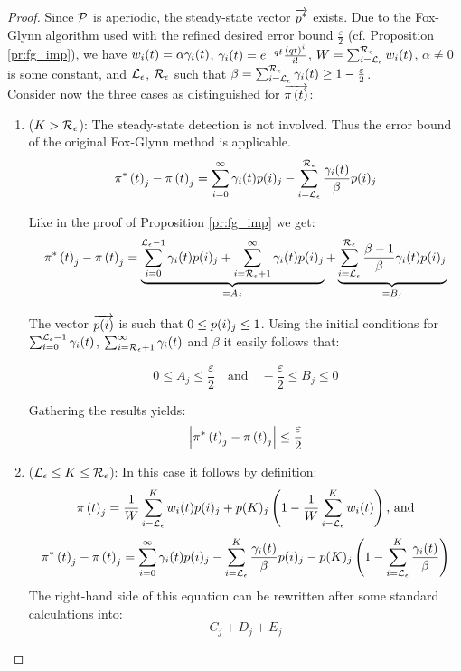 \documentclass{entcs}
\begin{document}
		{\small
			\begin{proof}
				Since $\mathcal{P}$ is aperiodic, the steady-state vector $\overrightarrow{p^{*}}$ exists. 
				Due to the Fox-Glynn algorithm used with the refined desired error bound $\frac{\varepsilon}{2}$ (cf. Proposition \ref{pr:fg_imp}), we have $w_{i}(t) = \alpha \gamma_{i}(t)$, $\gamma_{i}(t) = e^{-q t}\frac{\left( q t \right)^{i}}{i!} $, $W = \sum_{i = \mathcal{L}_{\epsilon}}^{\mathcal{R}_{\epsilon}} w_{i}(t)$, $\alpha \neq 0$ is some constant, and $\mathcal{L}_{\epsilon}$, $\mathcal{R}_{\epsilon}$ such that $\beta = \sum_{i=\mathcal{L}_{\epsilon}}^{\mathcal{R}_{\epsilon}} \gamma_{i}(t) \geq 1 - \frac{\varepsilon}{2}$.\\
				Consider now the three cases as distinguished for $\overrightarrow{\pi \left( t \right) }$:
				\begin{enumerate}
	
					\item ($K > \mathcal{R}_{\epsilon}$): The steady-state detection is not involved. Thus the error bound of the original Fox-Glynn method is applicable.
						\begin{equation}
							\pi^{*} \left( t \right)_{j} - \pi \left( t \right)_{j} =\sum_{i=0}^{\infty} \gamma_{i}(t) p(i)_{j} - \sum_{i=\mathcal{L}_{\epsilon}}^{\mathcal{R}_{\epsilon}}\frac{\gamma_{i}(t)}{\beta} p(i)_{j} \nonumber
						\end{equation}
	
						Like in the proof of Proposition \ref{pr:fg_imp} we get:
						\begin{equation}
							\pi^{*} \left( t \right)_{j} - \pi \left( t \right)_{j} = \underbrace{\sum_{i=0}^{\mathcal{L}_{\epsilon}-1} \gamma_{i}(t) p(i)_{j} + \sum_{i=\mathcal{R}_{\epsilon}+1}^{\infty} \gamma_{i}(t) p(i)_{j}}_{=A_j} + \underbrace{\sum_{i=\mathcal{L}_{\epsilon}}^{\mathcal{R}_{\epsilon}}\frac{\beta - 1}{\beta} \gamma_{i}(t) p(i)_{j}}_{=B_j} \nonumber
						\end{equation}
						
						The vector $\overrightarrow{p(i)}$ is such that $0 \leq p(i)_{j} \leq 1$. Using the initial conditions for $\sum_{i=0}^{\mathcal{L}_{\epsilon}-1} \gamma_{i}(t) $, $\sum_{i=\mathcal{R}_{\epsilon}+1}^{\infty} \gamma_{i}(t) $ and $\beta$ it easily follows that:
						
						$$
							0 \leq A_{j} \leq \frac{\varepsilon}{2} \quad 
							\text{and} \quad
							- \frac{\varepsilon}{2} \leq B_{j} \leq 0
						$$
	
						Gathering the results yields:
						\begin{equation}
							\left| \pi^{*} \left( t \right)_{j} - \pi \left( t \right)_{j} \right| \leq \frac{\varepsilon}{2}
						\end{equation}
	
					\item ($\mathcal{L}_{\epsilon} \leq K \leq \mathcal{R}_{\epsilon}$): In this case it follows by definition:
						\begin{equation}
							\pi \left( t \right)_{j} = \frac{1}{W} \sum_{i=\mathcal{L}_{\epsilon}}^{K}w_{i}(t) p(i)_{j} + p(K)_{j} \left(1- \frac{1}{W} \sum_{i=\mathcal{L}_{\epsilon}}^{K}w_{i}(t) \right) \nonumber \text{, and}
						\end{equation}
						\begin{equation}
							\pi^{*} \left( t \right)_{j} - \pi \left( t \right)_{j} = \sum_{i=0}^{\infty} \gamma_{i}(t) p(i)_{j} - \sum_{i=\mathcal{L}_{\epsilon}}^{K}\frac{\gamma_{i}(t)}{\beta} p(i)_{j} - p(K)_{j} \left(1 - \sum_{i=\mathcal{L}_{\epsilon}}^{K}\frac{\gamma_{i}(t)}{\beta} \right) \nonumber
						\end{equation}
							The right-hand side of this equation can be rewritten after some standard calculations into:
						\begin{equation}
							C_{j} + D_{j} + E_{j} \nonumber
						\end{equation}
	

\end{enumerate}
\end{proof}}
\end{document}

